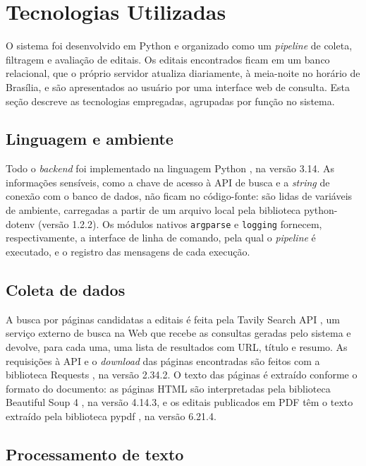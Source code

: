 \section{Tecnologias Utilizadas}
\label{sec:tecnologias}

O sistema foi desenvolvido em Python e organizado como um \textit{pipeline} de
coleta, filtragem e avaliação de editais. Os editais encontrados ficam em um
banco relacional, que o próprio servidor atualiza diariamente, à meia-noite no
horário de Brasília, e são
apresentados ao usuário por uma interface web de consulta. Esta seção descreve
as tecnologias empregadas, agrupadas por função no sistema.

\subsection{Linguagem e ambiente}

Todo o \textit{backend} foi implementado na linguagem Python \cite{python}, na
versão 3.14. As informações sensíveis, como a chave de acesso à API de busca e
a \textit{string} de conexão com o banco de dados, não ficam no código-fonte:
são lidas de variáveis de ambiente, carregadas a partir de um arquivo local pela
biblioteca python-dotenv (versão 1.2.2). Os módulos nativos \texttt{argparse} e
\texttt{logging} fornecem, respectivamente, a interface de linha de comando,
pela qual o \textit{pipeline} é executado, e o registro das mensagens de cada
execução.

\subsection{Coleta de dados}

A busca por páginas candidatas a editais é feita pela Tavily Search API
\cite{tavily}, um serviço externo de busca na Web que recebe as consultas
geradas pelo sistema e devolve, para cada uma, uma lista de resultados com URL,
título e resumo. As requisições à API e o \textit{download} das páginas
encontradas são feitos com a biblioteca Requests \cite{requests}, na versão
2.34.2. O texto das páginas é extraído conforme o formato do documento: as
páginas HTML são interpretadas pela biblioteca Beautiful Soup 4
\cite{beautifulsoup}, na versão 4.14.3, e os editais publicados em PDF têm o
texto extraído pela biblioteca pypdf \cite{pypdf}, na versão 6.21.4.

\subsection{Processamento de texto}

